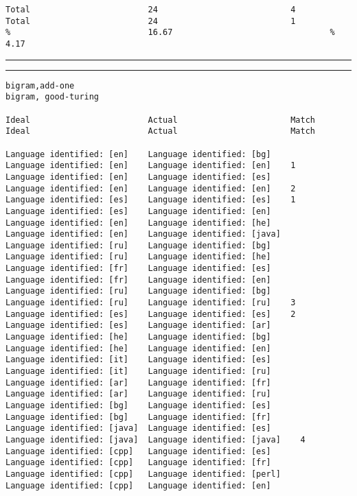 \begin{verbatim}
Total                        24                           4       Total                        24                           1
%                            16.67                                %                            4.17
\end{verbatim}
\vskip4pt\hrule

\clearpage

\tiny
\hrule\vskip4pt
\begin{verbatim}
bigram,add-one                                                    bigram, good-turing

Ideal                        Actual                       Match   Ideal                        Actual                       Match

Language identified: [en]    Language identified: [bg]            Language identified: [en]    Language identified: [en]    1
Language identified: [en]    Language identified: [es]            Language identified: [en]    Language identified: [en]    2
Language identified: [es]    Language identified: [es]    1       Language identified: [es]    Language identified: [en]
Language identified: [en]    Language identified: [he]            Language identified: [en]    Language identified: [java]
Language identified: [ru]    Language identified: [bg]            Language identified: [ru]    Language identified: [he]
Language identified: [fr]    Language identified: [es]            Language identified: [fr]    Language identified: [en]
Language identified: [ru]    Language identified: [bg]            Language identified: [ru]    Language identified: [ru]    3
Language identified: [es]    Language identified: [es]    2       Language identified: [es]    Language identified: [ar]
Language identified: [he]    Language identified: [bg]            Language identified: [he]    Language identified: [en]
Language identified: [it]    Language identified: [es]            Language identified: [it]    Language identified: [ru]
Language identified: [ar]    Language identified: [fr]            Language identified: [ar]    Language identified: [ru]
Language identified: [bg]    Language identified: [es]            Language identified: [bg]    Language identified: [fr]
Language identified: [java]  Language identified: [es]            Language identified: [java]  Language identified: [java]    4
Language identified: [cpp]   Language identified: [es]            Language identified: [cpp]   Language identified: [fr]
Language identified: [cpp]   Language identified: [perl]          Language identified: [cpp]   Language identified: [en]

\end{verbatim}
